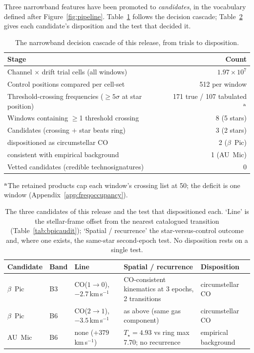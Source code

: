 \documentclass{openjournal}
\begin{document}
Three narrowband features have been promoted to \emph{candidates}, in
the vocabulary defined after Figure~\ref{fig:pipeline}.
Table~\ref{tab:funnel} follows the decision cascade;
Table~\ref{tab:candidates} gives each candidate's disposition and the
test that decided it.

\begin{table}
\centering
\small
\caption{The narrowband decision cascade of this release, from trials
to disposition.}
\label{tab:funnel}
\begin{tabular}{@{}lr@{}}
\hline
Stage & Count \\
\hline
Channel $\times$ drift trial cells (all windows) & $1.97\times10^{7}$ \\
Control positions compared per cell-set & 512 per window \\
Threshold-crossing frequencies ($\geq5\sigma$ at star position) & 171 true / 107 tabulated$^{\rm a}$ \\
Windows containing $\geq$1 threshold crossing & 8 (5 stars) \\
Candidates (crossing $+$ star beats ring) & 3 (2 stars) \\
\quad dispositioned as circumstellar CO & 2 ($\beta$~Pic) \\
\quad consistent with empirical background & 1 (AU~Mic) \\
Vetted candidates (credible technosignatures) & 0 \\
\hline
\end{tabular}
\parbox{\columnwidth}{\footnotesize $^{\rm a}$The retained products cap
each window's crossing list at 50; the deficit is one window
(Appendix~\ref{app:freqoccupancy}).}
\end{table}

\begin{table}
\centering
\small
\setlength{\tabcolsep}{4pt}
\caption{The three candidates of this release and the test that
dispositioned each. `Line' is the stellar-frame offset from the
nearest catalogued transition (Table~\ref{tab:bpicaudit}); `Spatial /
recurrence' the star-versus-control outcome and, where one exists,
the same-star second-epoch test. No disposition rests on a single
test.}
\label{tab:candidates}
\begin{tabular}{@{}lllll@{}}
\toprule
Candidate & Band & Line & Spatial / recurrence & Disposition \\
\midrule
$\beta$~Pic & B3 & CO($1{\to}0$), $-2.7$\,km\,s$^{-1}$ & CO-consistent kinematics at 3 epochs, 2 transitions & circumstellar CO \\
$\beta$~Pic & B6 & CO($2{\to}1$), $-3.5$\,km\,s$^{-1}$ & as above (same gas component) & circumstellar CO \\
AU~Mic & B6 & none ($+379$\,km\,s$^{-1}$) & $T_\star=4.93$ vs ring max 7.70; no recurrence & empirical background \\
\bottomrule
\end{tabular}
\end{table}
\end{document}
